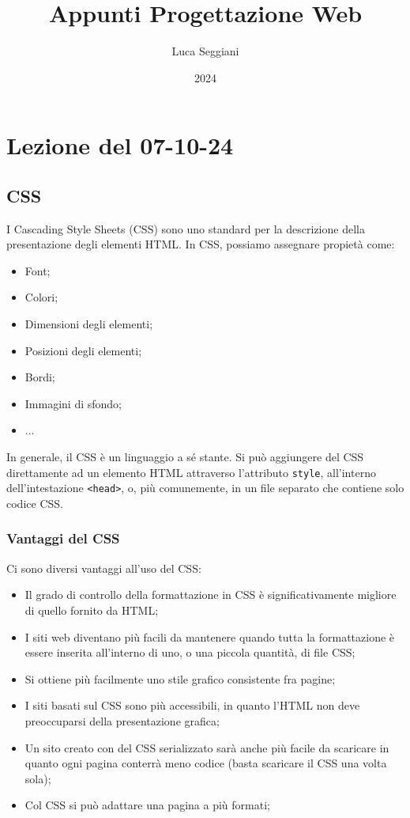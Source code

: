 \documentclass[a4paper,11pt]{article}
\title{Appunti Progettazione Web}
\author{Luca Seggiani}
\date{2024}
\begin{document}
\section{Lezione del 07-10-24}

\thispagestyle{empty}
\pagestyle{fancy}

\lstset{language=css, style=codestyle}

\subsection{CSS}
I Cascading Style Sheets (CSS) sono uno standard per la descrizione della presentazione degli elementi HTML.
In CSS, possiamo assegnare propietà come:
\begin{itemize}
	\item Font;
	\item Colori;
	\item Dimensioni degli elementi;
	\item Posizioni degli elementi;
	\item Bordi;
	\item Immagini di sfondo;
	\item ...
\end{itemize}

In generale, il CSS è un linguaggio a sé stante.
Si può aggiungere del CSS direttamente ad un elemento HTML attraverso l'attributo \lstinline|style|, all'interno dell'intestazione \lstinline|<head>|, o, più comunemente, in un file separato che contiene solo codice CSS.

\subsubsection{Vantaggi del CSS}
Ci sono diversi vantaggi all'uso del CSS:
\begin{itemize}
	\item Il grado di controllo della formattazione in CSS è significativamente migliore di quello fornito da HTML;
	\item I siti web diventano più facili da mantenere quando tutta la formattazione è essere inserita all'interno di uno, o una piccola quantità, di file CSS;
	\item Si ottiene più facilmente uno stile grafico consistente fra pagine;
	\item I siti basati sul CSS sono più accessibili, in quanto l'HTML non deve preoccuparsi della presentazione grafica;
	\item Un sito creato con del CSS serializzato sarà anche più facile da scaricare in quanto ogni pagina conterrà meno codice (basta scaricare il CSS una volta sola);
	\item Col CSS si può adattare una pagina a più formati;
\end{itemize}
\end{document}
